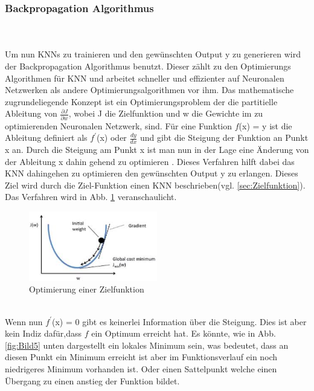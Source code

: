 \documentclass{llncs}
\begin{document}
\subsubsection{Backpropagation Algorithmus}\label{sec:test}
~\\\\
Um nun KNNs zu trainieren und den gewünschten Output y zu generieren wird der Backpropagation Algorithmus benutzt. Dieser zählt zu den Optimierungs Algorithmen für KNN und arbeitet schneller und effizienter auf Neuronalen Netzwerken als andere Optimierungsalgorithmen vor ihm. Das mathematische zugrundeliegende Konzept ist ein Optimierungsproblem der die partitielle Ableitung von  $\frac{\partial J}{\partial w}$, wobei J die Zielfunktion und w die Gewichte im zu optimierenden Neuronalen Netzwerk, sind. Für eine Funktion $f$(x) = y ist die Ableitung definiert als $f^\prime$(x) oder $\frac{dy}{dx}$ und gibt die Steigung der Funktion an Punkt x an. Durch die Steigung am Punkt x ist man nun in der Lage eine Änderung von der Ableitung x dahin gehend  zu optimieren \cite{Grundlagen}. Dieses Verfahren hilft dabei das KNN  dahingehen zu optimieren den gewünschten Output y zu erlangen. Dieses Ziel wird durch die Ziel-Funktion einen KNN beschrieben(vgl. \ref{sec:Zielfunktion}). Das Verfahren wird in Abb. \ref{fig:Bild4} veranschaulicht.   
\\
\begin{figure}[htbp] 
	\centering
	\includegraphics[width=0.5\textwidth]{gradient.png}
	\caption{Optimierung einer Zielfunktion}
	\label{fig:Bild4}
\end{figure}
\\
Wenn nun $f^\prime$(x) = 0 gibt es keinerlei Information über die Steigung. Dies ist aber kein Indiz dafür,dass $f$ ein Optimum erreicht hat. Es könnte, wie in Abb. \ref{fig:Bild5} unten dargestellt ein lokales Minimum sein, was bedeutet, dass an diesen Punkt ein Minimum erreicht ist aber im Funktionsverlauf ein noch niedrigeres Minimum vorhanden ist. Oder einen Sattelpunkt welche einen Übergang zu einen anstieg der Funktion bildet.
\end{document}
